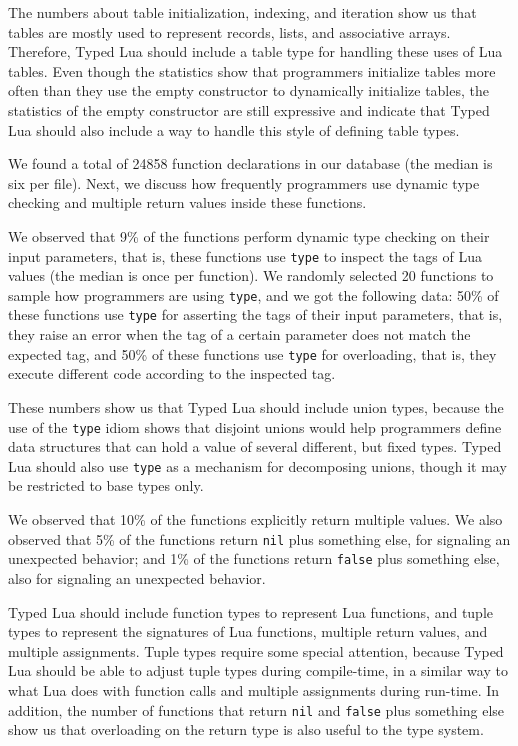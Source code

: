 The numbers about table initialization, indexing, and iteration
show us that tables are mostly used to represent records, lists,
and associative arrays.
Therefore, Typed Lua should include a table type for handling
these uses of Lua tables.
Even though the statistics show that programmers initialize tables
more often than they use the empty constructor to
dynamically initialize tables, the statistics of the empty
constructor are still expressive and indicate that Typed Lua should
also include a way to handle this style of defining table types.

We found a total of 24858 function declarations in our database
(the median is six per file).
Next, we discuss how frequently programmers use dynamic type
checking and multiple return values inside these functions.

We observed that 9\% of the functions perform dynamic type checking
on their input parameters, that is, these functions use \texttt{type}
to inspect the tags of Lua values (the median is once per function).
We randomly selected 20 functions to sample how programmers are
using \texttt{type}, and we got the following data:
50\% of these functions use \texttt{type} for asserting the tags of
their input parameters, that is, they raise an error when the tag of a
certain parameter does not match the expected tag, and
50\% of these functions use \texttt{type} for overloading, that is,
they execute different code according to the inspected tag.

These numbers show us that Typed Lua should include union types,
because the use of the \texttt{type} idiom shows that disjoint unions
would help programmers define data structures that can hold a value of
several different, but fixed types.
Typed Lua should also use \texttt{type} as a mechanism for decomposing
unions, though it may be restricted to base types only.

We observed that 10\% of the functions explicitly return multiple
values.
We also observed that 5\% of the functions return \texttt{nil} plus
something else, for signaling an unexpected behavior;
and 1\% of the functions return \texttt{false} plus something else,
also for signaling an unexpected behavior.

Typed Lua should include function types to represent Lua functions,
and tuple types to represent the signatures of Lua functions,
multiple return values, and multiple assignments.
Tuple types require some special attention, because Typed Lua
should be able to adjust tuple types during compile-time, in a
similar way to what Lua does with function calls and multiple
assignments during run-time.
In addition, the number of functions that return \texttt{nil} and
\texttt{false} plus something else show us that overloading on the
return type is also useful to the type system.

